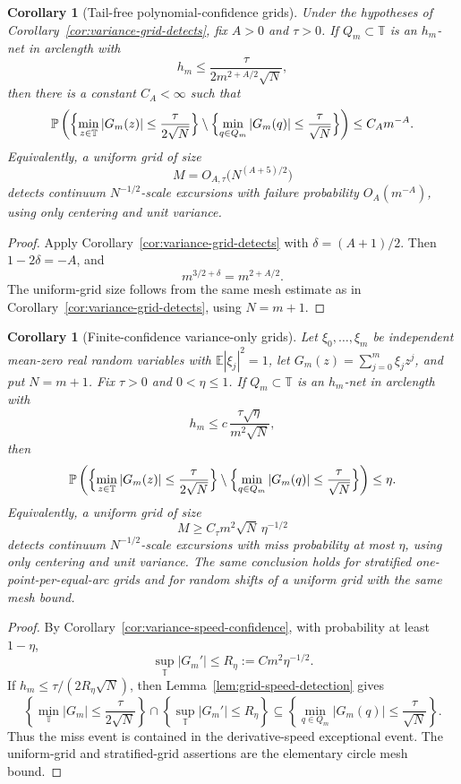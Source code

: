 \documentclass[11pt]{amsart}
\numberwithin{equation}{section}
\newtheorem{corollary}[theorem]{Corollary}
\theoremstyle{definition}
\theoremstyle{remark}
\newcommand{\T}{\mathbb T}
\newcommand{\Prob}{\mathbb P}
\newcommand{\Exp}{\mathbb E}
\newcommand{\abs}[1]{\left\lvert #1\right\rvert}
\begin{document}
\begin{corollary}[Tail-free polynomial-confidence grids]
\label{cor:variance-grid-polynomial-confidence}
Under the hypotheses of Corollary~\ref{cor:variance-grid-detects}, fix
\(A>0\) and \(\tau>0\).  If \(Q_m\subset\T\) is an \(h_m\)-net in arclength
with
\[
  h_m\le \frac{\tau}{2m^{2+A/2}\sqrt N},
\]
then there is a constant \(C_A<\infty\) such that
\[
  \Prob\left(
    \Bigl\{\min_{z\in\T}\abs{G_m(z)}\le \frac{\tau}{2\sqrt N}\Bigr\}
    \setminus
    \Bigl\{\min_{q\in Q_m}\abs{G_m(q)}\le \frac{\tau}{\sqrt N}\Bigr\}
  \right)
  \le C_A m^{-A}.
\]
Equivalently, a uniform grid of size
\[
  M=O_{A,\tau}\bigl(N^{(A+5)/2}\bigr)
\]
detects continuum \(N^{-1/2}\)-scale excursions with failure probability
\(O_A(m^{-A})\), using only centering and unit variance.
\end{corollary}

\begin{proof}
Apply Corollary~\ref{cor:variance-grid-detects} with
\(\delta=(A+1)/2\).  Then \(1-2\delta=-A\), and
\[
  m^{3/2+\delta}=m^{2+A/2}.
\]
The uniform-grid size follows from the same mesh estimate as in
Corollary~\ref{cor:variance-grid-detects}, using \(N=m+1\).
\end{proof}

\begin{corollary}[Finite-confidence variance-only grids]
\label{cor:variance-grid-confidence}
Let \(\xi_0,\ldots,\xi_m\) be independent mean-zero real random variables with
\(\Exp|\xi_j|^2=1\), let \(G_m(z)=\sum_{j=0}^m\xi_jz^j\), and put
\(N=m+1\).  Fix \(\tau>0\) and \(0<\eta\le1\).  If \(Q_m\subset\T\) is an
\(h_m\)-net in arclength with
\[
  h_m\le c\,\frac{\tau\sqrt\eta}{m^2\sqrt N},
\]
then
\[
  \Prob\left(
    \Bigl\{\min_{z\in\T}\abs{G_m(z)}\le \frac{\tau}{2\sqrt N}\Bigr\}
    \setminus
    \Bigl\{\min_{q\in Q_m}\abs{G_m(q)}\le \frac{\tau}{\sqrt N}\Bigr\}
  \right)
  \le \eta .
\]
Equivalently, a uniform grid of size
\[
  M\ge C_\tau m^2\sqrt N\,\eta^{-1/2}
\]
detects continuum \(N^{-1/2}\)-scale excursions with miss probability at most
\(\eta\), using only centering and unit variance.  The same conclusion holds
for stratified one-point-per-equal-arc grids and for random shifts of a uniform
grid with the same mesh bound.
\end{corollary}

\begin{proof}
By Corollary~\ref{cor:variance-speed-confidence}, with probability at least
\(1-\eta\),
\[
  \sup_{\T}|G_m'|\le R_\eta:=C m^2\eta^{-1/2}.
\]
If \(h_m\le\tau/(2R_\eta\sqrt N)\), then
Lemma~\ref{lem:grid-speed-detection} gives
\[
  \left\{\min_{\T}\abs{G_m}\le \frac{\tau}{2\sqrt N}\right\}
  \cap
  \left\{\sup_{\T}|G_m'|\le R_\eta\right\}
  \subseteq
  \left\{\min_{q\in Q_m}\abs{G_m(q)}\le \frac{\tau}{\sqrt N}\right\}.
\]
Thus the miss event is contained in the derivative-speed exceptional event.
The uniform-grid and stratified-grid assertions are the elementary circle mesh
bound.
\end{proof}
\end{document}
